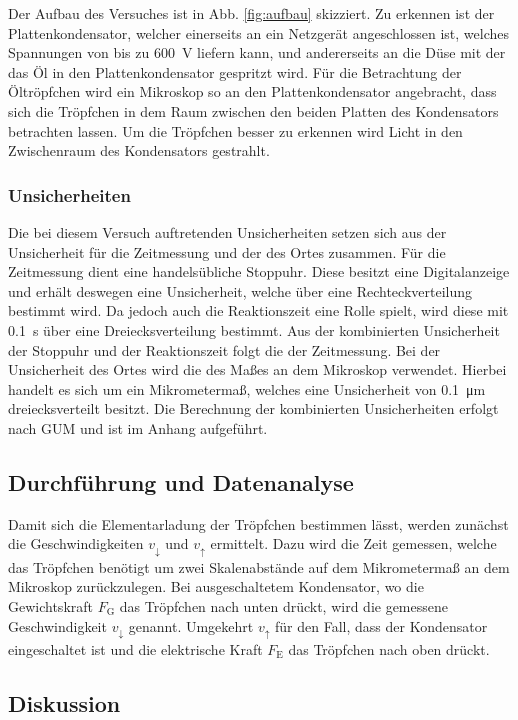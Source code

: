 Der Aufbau des Versuches ist in Abb. \ref{fig:aufbau} skizziert. 
Zu erkennen ist der Plattenkondensator, welcher einerseits an ein Netzgerät angeschlossen ist, welches Spannungen von bis zu \SI{600}{\volt} liefern kann, und andererseits an die Düse mit der das Öl in den Plattenkondensator gespritzt wird.
Für die Betrachtung der Öltröpfchen wird ein Mikroskop so an den Plattenkondensator angebracht, dass sich die Tröpfchen in dem Raum zwischen den beiden Platten des Kondensators betrachten lassen. 
Um die Tröpfchen besser zu erkennen wird Licht in den Zwischenraum des Kondensators gestrahlt.


\subsubsection{Unsicherheiten}

Die bei diesem Versuch auftretenden Unsicherheiten setzen sich aus der Unsicherheit für die Zeitmessung und der des Ortes zusammen.
Für die Zeitmessung dient eine handelsübliche Stoppuhr.
Diese besitzt eine Digitalanzeige und erhält deswegen eine Unsicherheit, welche über eine Rechteckverteilung bestimmt wird.
Da jedoch auch die Reaktionszeit eine Rolle spielt, wird diese mit \SI{0,1}{\second} über eine Dreiecksverteilung bestimmt.
Aus der kombinierten Unsicherheit der Stoppuhr und der Reaktionszeit folgt die der Zeitmessung.
Bei der Unsicherheit des Ortes wird die des Maßes an dem Mikroskop verwendet.
Hierbei handelt es sich um ein Mikrometermaß, welches eine Unsicherheit von \SI{0,1}{\micro\meter} dreiecksverteilt besitzt.
Die Berechnung der kombinierten Unsicherheiten erfolgt nach GUM und ist im Anhang aufgeführt.

\subsection{Durchführung und Datenanalyse}

Damit sich die Elementarladung der Tröpfchen bestimmen lässt, werden zunächst die Geschwindigkeiten $v_{\downarrow}$ und $v_{\uparrow}$ ermittelt.
Dazu wird die Zeit gemessen, welche das Tröpfchen benötigt um zwei Skalenabstände auf dem Mikrometermaß an dem Mikroskop zurückzulegen.
Bei ausgeschaltetem Kondensator, wo die Gewichtskraft $F_\text{G}$ das Tröpfchen nach unten drückt, wird die gemessene Geschwindigkeit $v_{\downarrow}$ genannt.
Umgekehrt $v_{\uparrow}$ für den Fall, dass der Kondensator eingeschaltet ist und die elektrische Kraft $F_\text{E}$ das Tröpfchen nach oben drückt. 

\subsection{Diskussion}


